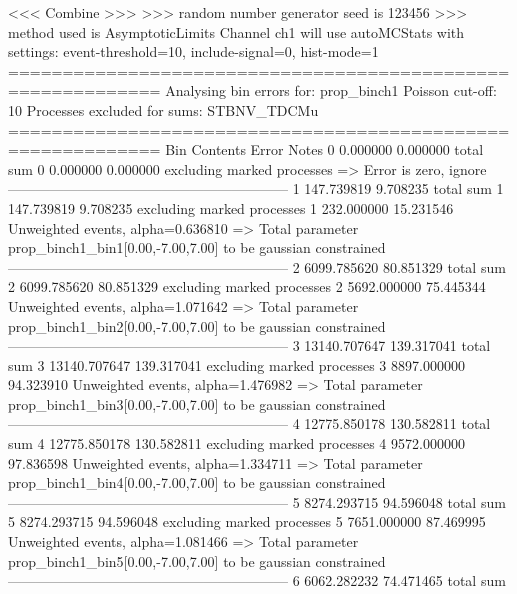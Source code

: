  <<< Combine >>> 
>>> random number generator seed is 123456
>>> method used is AsymptoticLimits
Channel ch1 will use autoMCStats with settings: event-threshold=10, include-signal=0, hist-mode=1
============================================================
Analysing bin errors for: prop_binch1
Poisson cut-off: 10
Processes excluded for sums: STBNV_TDCMu
============================================================
Bin        Contents        Error           Notes                         
0          0.000000        0.000000        total sum                     
0          0.000000        0.000000        excluding marked processes    
  => Error is zero, ignore      
------------------------------------------------------------
1          147.739819      9.708235        total sum                     
1          147.739819      9.708235        excluding marked processes    
1          232.000000      15.231546       Unweighted events, alpha=0.636810
  => Total parameter prop_binch1_bin1[0.00,-7.00,7.00] to be gaussian constrained
------------------------------------------------------------
2          6099.785620     80.851329       total sum                     
2          6099.785620     80.851329       excluding marked processes    
2          5692.000000     75.445344       Unweighted events, alpha=1.071642
  => Total parameter prop_binch1_bin2[0.00,-7.00,7.00] to be gaussian constrained
------------------------------------------------------------
3          13140.707647    139.317041      total sum                     
3          13140.707647    139.317041      excluding marked processes    
3          8897.000000     94.323910       Unweighted events, alpha=1.476982
  => Total parameter prop_binch1_bin3[0.00,-7.00,7.00] to be gaussian constrained
------------------------------------------------------------
4          12775.850178    130.582811      total sum                     
4          12775.850178    130.582811      excluding marked processes    
4          9572.000000     97.836598       Unweighted events, alpha=1.334711
  => Total parameter prop_binch1_bin4[0.00,-7.00,7.00] to be gaussian constrained
------------------------------------------------------------
5          8274.293715     94.596048       total sum                     
5          8274.293715     94.596048       excluding marked processes    
5          7651.000000     87.469995       Unweighted events, alpha=1.081466
  => Total parameter prop_binch1_bin5[0.00,-7.00,7.00] to be gaussian constrained
------------------------------------------------------------
6          6062.282232     74.471465       total sum                     
